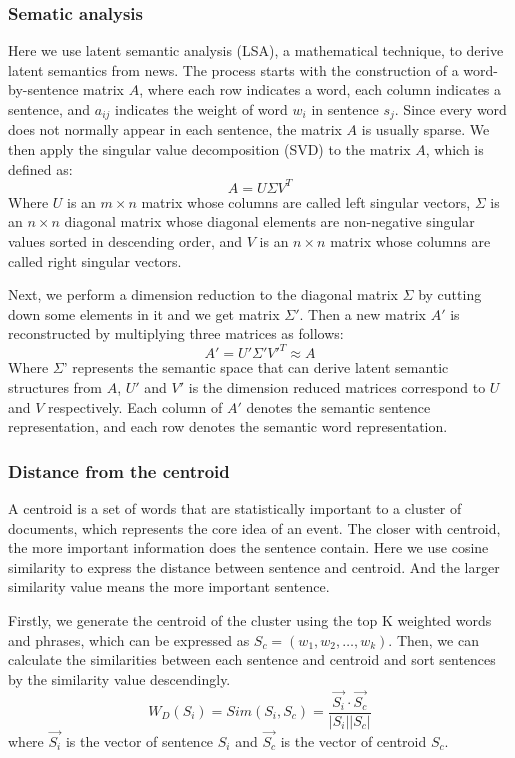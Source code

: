\documentclass[conference]{IEEEtran}
\begin{document}
\subsubsection{Sematic analysis}

Here we use latent semantic analysis (LSA), a mathematical technique, to derive latent semantics from news. The process starts with the construction of a word-by-sentence matrix $A$, where each row indicates a word, each column indicates a sentence, and $a_{ij}$ indicates the weight of word $w_i$ in sentence $s_j$. Since every word does not normally appear in each sentence, the matrix $A$ is usually sparse. We then apply the singular value decomposition (SVD) to the matrix $A$, which is defined as:
\begin{equation}
A = U \Sigma V^T
\end{equation}
Where $U$ is an $m×n$ matrix whose columns are called left singular vectors, $\Sigma$ is an $n×n$ diagonal matrix whose diagonal elements are non-negative singular values sorted in descending order, and $V$ is an $n×n$ matrix whose columns are called right singular vectors.

Next, we perform a dimension reduction to the diagonal matrix $\Sigma$ by cutting down some elements in it and we get matrix $\Sigma '$. Then a new matrix $A'$ is reconstructed by multiplying three matrices as follows:
\begin{equation}
A'=U'\Sigma'V'^T \approx A
\end{equation}
Where $\Sigma$' represents the semantic space that can derive latent semantic structures from $A$, $U'$ and $V'$ is the dimension reduced matrices correspond to $U$ and $V$ respectively. Each column of $A'$ denotes the semantic sentence representation, and each row denotes the semantic word representation.

\subsubsection{Distance from the centroid}
A centroid is a set of words that are statistically important to a cluster of documents, which represents the core idea of an event. The closer with centroid, the more important information does the sentence contain. Here we use cosine similarity to express the distance between sentence and centroid. And the larger similarity value means the more important sentence.

Firstly, we generate the centroid of the cluster using the top K weighted words and phrases, which can be expressed as $S_c=(w_1,w_2,…,w_k)$. Then, we can calculate the similarities between each sentence and centroid and sort sentences by the similarity value descendingly.
\begin{equation}
W_D(S_i)  = Sim(S_i, S_c) =\frac{ \overrightarrow{S_i} \cdot \overrightarrow{S_c}  }{|S_i||S_c|}
\end{equation}
where $ \overrightarrow{S_i}$ is the vector of sentence $S_i$ and $\overrightarrow{S_c}$ is the vector of centroid $S_c$.
\end{document}
